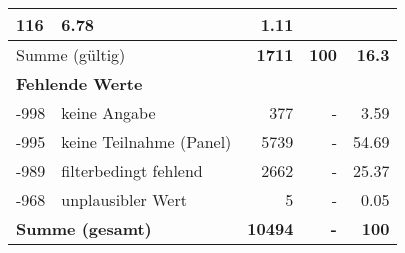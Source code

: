 \begin{longtable}{lXrrr}
       \num{116} &
       \num[round-mode=places,round-precision=2]{6,78} &
         \num[round-mode=places,round-precision=2]{1,11} \\
     \midrule
     \multicolumn{2}{l}{Summe (gültig)} &
       \textbf{\num{1711}} &
     \textbf{100} &
       \textbf{\num[round-mode=places,round-precision=2]{16,3}} \\
     \multicolumn{5}{l}{\textbf{Fehlende Werte}}\\
       -998 &
       keine Angabe &
         \num{377} &
        - &
         \num[round-mode=places,round-precision=2]{3,59} \\
       -995 &
       keine Teilnahme (Panel) &
         \num{5739} &
        - &
         \num[round-mode=places,round-precision=2]{54,69} \\
       -989 &
       filterbedingt fehlend &
         \num{2662} &
        - &
         \num[round-mode=places,round-precision=2]{25,37} \\
       -968 &
       unplausibler Wert &
         \num{5} &
        - &
         \num[round-mode=places,round-precision=2]{0,05} \\
     \midrule
     \multicolumn{2}{l}{\textbf{Summe (gesamt)}} &
          \textbf{\num{10494}} &
        \textbf{-} &
        \textbf{100} \\
     \bottomrule
     \end{longtable}
     
